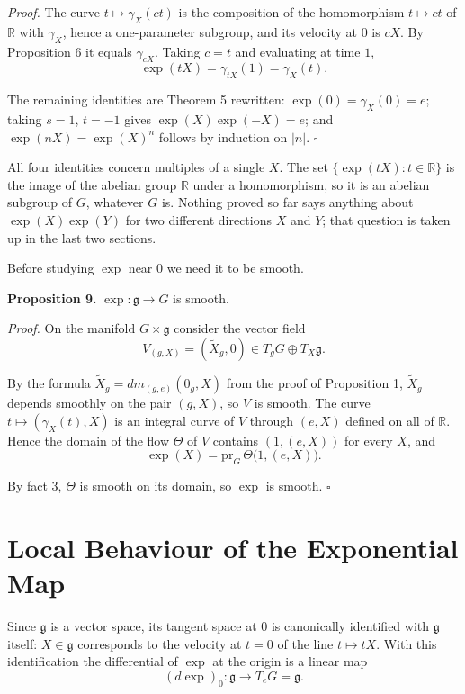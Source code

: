 \documentclass[11pt]{article}
\begin{document}
\emph{Proof.} The curve $t \mapsto \gamma_X(ct)$ is the composition of the homomorphism $t \mapsto ct$ of $\mathbb{R}$ with $\gamma_X$, hence a one-parameter subgroup, and its velocity at $0$ is $cX$. By Proposition 6 it equals $\gamma_{cX}$. Taking $c = t$ and evaluating at time $1$,
\[
\exp(tX) = \gamma_{tX}(1) = \gamma_X(t).
\]

The remaining identities are Theorem 5 rewritten: $\exp(0) = \gamma_X(0) = e$; taking $s = 1$, $t = -1$ gives $\exp(X)\exp(-X) = e$; and $\exp(nX) = \exp(X)^n$ follows by induction on $|n|$. $\square$

All four identities concern multiples of a single $X$. The set $\{\exp(tX) : t \in \mathbb{R}\}$ is the image of the abelian group $\mathbb{R}$ under a homomorphism, so it is an abelian subgroup of $G$, whatever $G$ is. Nothing proved so far says anything about $\exp(X)\exp(Y)$ for two different directions $X$ and $Y$; that question is taken up in the last two sections.

Before studying $\exp$ near $0$ we need it to be smooth.

\textbf{Proposition 9.} $\exp : \mathfrak{g} \to G$ is smooth.

\emph{Proof.} On the manifold $G \times \mathfrak{g}$ consider the vector field
\[
V_{(g, X)} = (\widetilde{X}_g, 0) \in T_gG \oplus T_X\mathfrak{g}.
\]

By the formula $\widetilde{X}_g = dm_{(g, e)}(0_g, X)$ from the proof of Proposition 1, $\widetilde{X}_g$ depends smoothly on the pair $(g, X)$, so $V$ is smooth. The curve $t \mapsto (\gamma_X(t), X)$ is an integral curve of $V$ through $(e, X)$ defined on all of $\mathbb{R}$. Hence the domain of the flow $\Theta$ of $V$ contains $(1, (e, X))$ for every $X$, and
\[
\exp(X) = \mathrm{pr}_G\, \Theta\bigl(1, (e, X)\bigr).
\]

By fact 3, $\Theta$ is smooth on its domain, so $\exp$ is smooth. $\square$

\section{Local Behaviour of the Exponential Map}

Since $\mathfrak{g}$ is a vector space, its tangent space at $0$ is canonically identified with $\mathfrak{g}$ itself: $X \in \mathfrak{g}$ corresponds to the velocity at $t = 0$ of the line $t \mapsto tX$. With this identification the differential of $\exp$ at the origin is a linear map
\[
(d\exp)_0 : \mathfrak{g} \to T_eG = \mathfrak{g}.
\]
\end{document}
